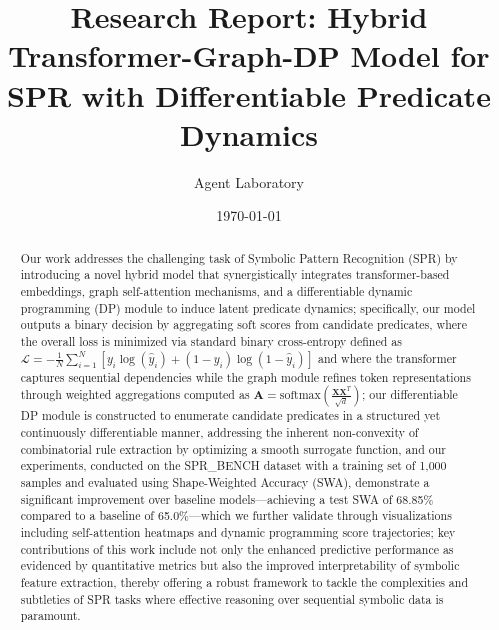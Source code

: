 \documentclass{article}
\title{Research Report: Hybrid Transformer-Graph-DP Model for SPR with Differentiable Predicate Dynamics}
\author{Agent Laboratory}
\date{\today}
\begin{document}
\maketitle

\begin{abstract}
Our work addresses the challenging task of Symbolic Pattern Recognition (SPR) by introducing a novel hybrid model that synergistically integrates transformer-based embeddings, graph self-attention mechanisms, and a differentiable dynamic programming (DP) module to induce latent predicate dynamics; specifically, our model outputs a binary decision by aggregating soft scores from candidate predicates, where the overall loss is minimized via standard binary cross-entropy defined as \(\mathcal{L} = -\frac{1}{N}\sum_{i=1}^{N}\left[y_i\log(\hat{y}_i)+(1-y_i)\log(1-\hat{y}_i)\right]\) and where the transformer captures sequential dependencies while the graph module refines token representations through weighted aggregations computed as \(\textbf{A} = \text{softmax}\left(\frac{\textbf{X}\textbf{X}^T}{\sqrt{d}}\right)\); our differentiable DP module is constructed to enumerate candidate predicates in a structured yet continuously differentiable manner, addressing the inherent non-convexity of combinatorial rule extraction by optimizing a smooth surrogate function, and our experiments, conducted on the SPR\_BENCH dataset with a training set of 1,000 samples and evaluated using Shape-Weighted Accuracy (SWA), demonstrate a significant improvement over baseline models—achieving a test SWA of 68.85\% compared to a baseline of 65.0\%—which we further validate through visualizations including self-attention heatmaps and dynamic programming score trajectories; key contributions of this work include not only the enhanced predictive performance as evidenced by quantitative metrics but also the improved interpretability of symbolic feature extraction, thereby offering a robust framework to tackle the complexities and subtleties of SPR tasks where effective reasoning over sequential symbolic data is paramount.
\end{abstract}
\end{document}

